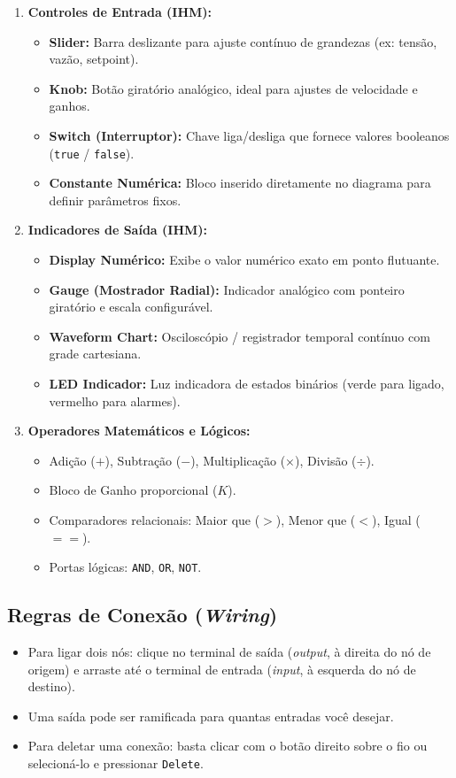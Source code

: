\documentclass[11pt,a4paper]{article}
\begin{document}
\begin{enumerate}[leftmargin=*]
    \item \textbf{Controles de Entrada (IHM):}
    \begin{itemize}
        \item \textbf{Slider:} Barra deslizante para ajuste contínuo de grandezas (ex: tensão, vazão, setpoint).
        \item \textbf{Knob:} Botão giratório analógico, ideal para ajustes de velocidade e ganhos.
        \item \textbf{Switch (Interruptor):} Chave liga/desliga que fornece valores booleanos (\texttt{true} / \texttt{false}).
        \item \textbf{Constante Numérica:} Bloco inserido diretamente no diagrama para definir parâmetros fixos.
    \end{itemize}
    \item \textbf{Indicadores de Saída (IHM):}
    \begin{itemize}
        \item \textbf{Display Numérico:} Exibe o valor numérico exato em ponto flutuante.
        \item \textbf{Gauge (Mostrador Radial):} Indicador analógico com ponteiro giratório e escala configurável.
        \item \textbf{Waveform Chart:} Osciloscópio / registrador temporal contínuo com grade cartesiana.
        \item \textbf{LED Indicador:} Luz indicadora de estados binários (verde para ligado, vermelho para alarmes).
    \end{itemize}
    \item \textbf{Operadores Matemáticos e Lógicos:}
    \begin{itemize}
        \item Adição ($+$), Subtração ($-$), Multiplicação ($\times$), Divisão ($\div$).
        \item Bloco de Ganho proporcional ($K$).
        \item Comparadores relacionais: Maior que ($>$), Menor que ($<$), Igual ($==$).
        \item Portas lógicas: \texttt{AND}, \texttt{OR}, \texttt{NOT}.
    \end{itemize}
\end{enumerate}

\subsection{Regras de Conexão (\textit{Wiring})}
\begin{itemize}
    \item Para ligar dois nós: clique no terminal de saída (\textit{output}, à direita do nó de origem) e arraste até o terminal de entrada (\textit{input}, à esquerda do nó de destino).
    \item Uma saída pode ser ramificada para quantas entradas você desejar.
    \item Para deletar uma conexão: basta clicar com o botão direito sobre o fio ou selecioná-lo e pressionar \texttt{Delete}.
\end{itemize}
\end{document}

